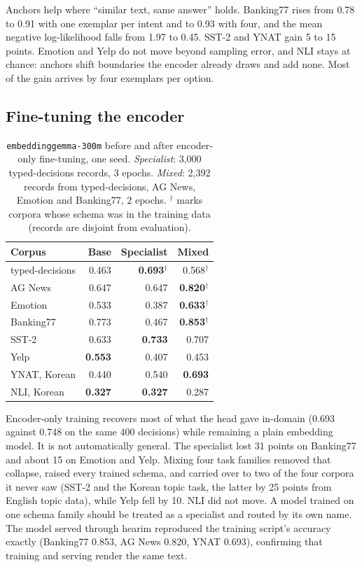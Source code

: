 \documentclass[11pt]{article}
\begin{document}
Anchors help where ``similar text, same answer'' holds. Banking77 rises from
0.78 to 0.91 with one exemplar per intent and to 0.93 with four, and the mean
negative log-likelihood falls from 1.97 to 0.45. SST-2 and YNAT gain 5 to 15
points. Emotion and Yelp do not move beyond sampling error, and NLI stays at
chance: anchors shift boundaries the encoder already draws and add none. Most
of the gain arrives by four exemplars per option.

\subsection{Fine-tuning the encoder}

\begin{table}[h]\centering
\begin{tabular}{lrrr}
\toprule
Corpus & Base & Specialist & Mixed \\
\midrule
typed-decisions & 0.463 & \textbf{0.693}$^{\dagger}$ & 0.568$^{\dagger}$ \\
AG News & 0.647 & 0.647 & \textbf{0.820}$^{\dagger}$ \\
Emotion & 0.533 & 0.387 & \textbf{0.633}$^{\dagger}$ \\
Banking77 & 0.773 & 0.467 & \textbf{0.853}$^{\dagger}$ \\
\midrule
SST-2 & 0.633 & \textbf{0.733} & 0.707 \\
Yelp & \textbf{0.553} & 0.407 & 0.453 \\
YNAT, Korean & 0.440 & 0.540 & \textbf{0.693} \\
NLI, Korean & \textbf{0.327} & \textbf{0.327} & 0.287 \\
\bottomrule
\end{tabular}
\caption{\texttt{embeddinggemma-300m} before and after encoder-only
fine-tuning, one seed. \emph{Specialist}: 3{,}000 typed-decisions records,
3 epochs. \emph{Mixed}: 2{,}392 records from typed-decisions, AG News, Emotion
and Banking77, 2 epochs. $^{\dagger}$ marks corpora whose schema was in the
training data (records are disjoint from evaluation).}
\label{tab:ft}
\end{table}

Encoder-only training recovers most of what the head gave in-domain (0.693
against 0.748 on the same 400 decisions) while remaining a plain embedding
model. It is not automatically general. The specialist lost 31 points on
Banking77 and about 15 on Emotion and Yelp. Mixing four task families removed
that collapse, raised every trained schema, and carried over to two of the
four corpora it never saw (SST-2 and the Korean topic task, the latter by 25
points from English topic data), while Yelp fell by 10. NLI did not move. A
model trained on one schema family should be treated as a specialist and
routed by its own name. The model served through hearim reproduced the
training script's accuracy exactly (Banking77 0.853, AG News 0.820, YNAT
0.693), confirming that training and serving render the same text.
\end{document}
